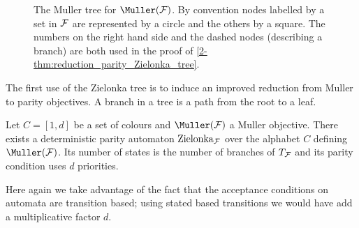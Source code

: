 \begin{figure}
\centering
\caption{The Muller tree for $\Muller(\F)$. By convention nodes labelled by a set in $\mathcal{F}$ are represented by a circle
and the others by a square.
The numbers on the right hand side and the dashed nodes (describing a branch) are both used in the proof of \cref{2-thm:reduction_parity_Zielonka_tree}.}
\label{2-fig:Zielonka_tree_example}
\end{figure}

The first use of the Zielonka tree is to induce an improved reduction from Muller to parity objectives.
A branch in a tree is a path from the root to a leaf.

\begin{theorem}
\label{2-thm:reduction_parity_Zielonka_tree}
Let $C = [1,d]$ be a set of colours and $\Muller(\F)$ a Muller objective.
There exists a deterministic parity automaton $\mathrm{Zielonka}_{\mathcal{F}}$ over the alphabet $C$ defining $\Muller(\F)$.
Its number of states is the number of branches of $T_{\mathcal{F}}$ and its parity condition uses $d$ priorities.
\end{theorem}

Here again we take advantage of the fact that the acceptance conditions on automata are transition based;
using stated based transitions we would have add a multiplicative factor $d$.

